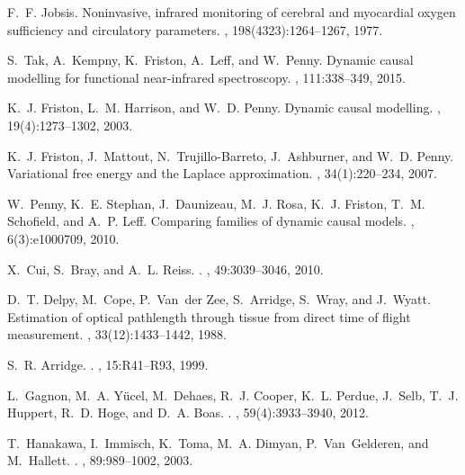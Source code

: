 \clearpage

\begin{thebibliography}{10}

F.~F. Jobsis.
\newblock Noninvasive, infrared monitoring of cerebral and myocardial oxygen
  sufficiency and circulatory parameters.
, 198(4323):1264--1267, 1977.

S.~Tak, A.~Kempny, K.~Friston, A.~Leff, and W.~Penny.
\newblock Dynamic causal modelling for functional near-infrared spectroscopy.
, 111:338--349, 2015.

K.~J. Friston, L.~M. Harrison, and W.~D. Penny.
\newblock Dynamic causal modelling.
, 19(4):1273--1302, 2003.

K.~J. Friston, J.~Mattout, N.~Trujillo-Barreto, J.~Ashburner, and W.~D. Penny.
\newblock Variational free energy and the {Laplace} approximation.
, 34(1):220--234, 2007.

W.~Penny, K.~E. Stephan, J.~Daunizeau, M.~J. Rosa, K.~J. Friston, T.~M.
  Schofield, and A.~P. Leff.
\newblock Comparing families of dynamic causal models.
, 6(3):e1000709, 2010.

X.~Cui, S.~Bray, and A.~L. Reiss.
.
, 49:3039--3046, 2010.

D.~T. Delpy, M.~Cope, P.~Van~der Zee, S.~Arridge, S.~Wray, and J.~Wyatt.
\newblock Estimation of optical pathlength through tissue from direct time of
  flight measurement.
, 33(12):1433--1442, 1988.

S.~R. Arridge.
.
, 15:R41--R93, 1999.

L.~Gagnon, M.~A. Y{\"u}cel, M.~Dehaes, R.~J. Cooper, K.~L. Perdue, J.~Selb,
  T.~J. Huppert, R.~D. Hoge, and D.~A. Boas.
.
, 59(4):3933--3940, 2012.

T.~Hanakawa, I.~Immisch, K.~Toma, M.~A. Dimyan, P.~Van~Gelderen, and
  M.~Hallett.
.
, 89:989--1002, 2003.


\end{thebibliography}
